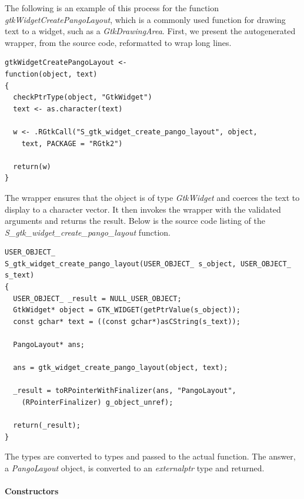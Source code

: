 \documentclass[article]{jss}
\begin{document}
The following is an example of this process for the function 
\emph{gtkWidgetCreatePangoLayout}, which is a commonly used function
for
drawing text to a widget, such as a \emph{GtkDrawingArea}. First, we
present
the autogenerated  wrapper, from the  source
code, 
reformatted to wrap long lines.
\begin{verbatim}
gtkWidgetCreatePangoLayout <-
function(object, text)
{
  checkPtrType(object, "GtkWidget")
  text <- as.character(text)

  w <- .RGtkCall("S_gtk_widget_create_pango_layout", object, 
    text, PACKAGE = "RGtk2")

  return(w)
}
\end{verbatim}
The wrapper ensures that the object is of type \emph{GtkWidget} and
coerces
the text to display to a character vector. It then invokes the
wrapper with the validated arguments and returns the result. Below is
the
source code listing of the
\emph{S\_gtk\_widget\_create\_pango\_layout} function.
\begin{verbatim}
USER_OBJECT_
S_gtk_widget_create_pango_layout(USER_OBJECT_ s_object, USER_OBJECT_
s_text)
{
  USER_OBJECT_ _result = NULL_USER_OBJECT;
  GtkWidget* object = GTK_WIDGET(getPtrValue(s_object));
  const gchar* text = ((const gchar*)asCString(s_text));

  PangoLayout* ans;

  ans = gtk_widget_create_pango_layout(object, text);

  _result = toRPointerWithFinalizer(ans, "PangoLayout", 
    (RPointerFinalizer) g_object_unref);

  return(_result);
}
\end{verbatim}
The  types are converted to  types and passed
to
the actual  function. The answer, a \emph{PangoLayout}
object, is
converted to an  \emph{externalptr} type and returned.

\paragraph{Constructors}
\end{document}
